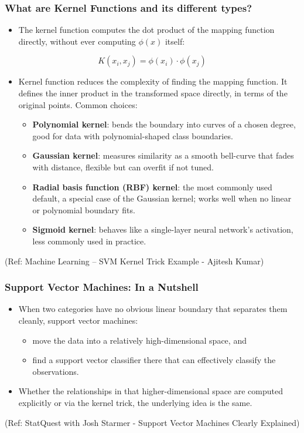 \begin{frame}[fragile] \frametitle{What are Kernel Functions and its different types?}

\begin{itemize}
\item The kernel function computes the dot product of the mapping function directly, without ever computing $\phi(x)$ itself:
\end{itemize}
\[
K(x_i,x_j) = \phi(x_i)\cdot\phi(x_j)
\]
\begin{itemize}
\item Kernel function reduces the complexity of finding the mapping function. It defines the inner product in the transformed space directly, in terms of the original points. Common choices:
\begin{itemize}
\item \textbf{Polynomial kernel}: bends the boundary into curves of a chosen degree, good for data with polynomial-shaped class boundaries.
\item \textbf{Gaussian kernel}: measures similarity as a smooth bell-curve that fades with distance, flexible but can overfit if not tuned.
\item \textbf{Radial basis function (RBF) kernel}: the most commonly used default, a special case of the Gaussian kernel; works well when no linear or polynomial boundary fits.
\item \textbf{Sigmoid kernel}: behaves like a single-layer neural network's activation, less commonly used in practice.
\end{itemize}
\end{itemize}

{\tiny (Ref: Machine Learning – SVM Kernel Trick Example - Ajitesh Kumar)}
\end{frame}

\begin{frame}[fragile]\frametitle{Support Vector Machines: In a Nutshell}
\begin{itemize}
\item When two categories have no obvious linear boundary that separates them cleanly, support vector machines:
\begin{itemize}
\item move the data into a relatively high-dimensional space, and
\item find a support vector classifier there that can effectively classify the observations.
\end{itemize}
\item Whether the relationships in that higher-dimensional space are computed explicitly or via the kernel trick, the underlying idea is the same.
\end{itemize}
{\tiny (Ref: StatQuest with Josh Starmer - Support Vector Machines Clearly Explained)}
\end{frame}

